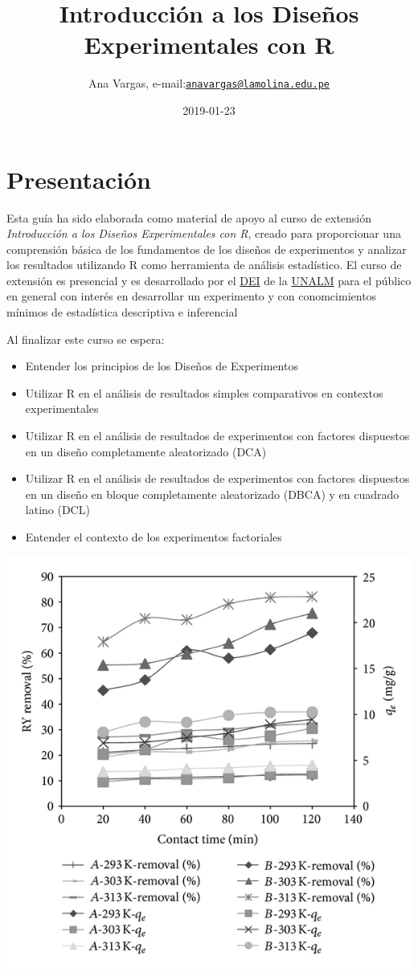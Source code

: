 \documentclass[]{book}
\title{Introducción a los Diseños Experimentales con R}
\author{Ana Vargas,
e-mail:\href{mailto:anavargas@lamolina.edu.pe}{\nolinkurl{anavargas@lamolina.edu.pe}}}
\date{2019-01-23}
\providecommand{\tightlist}{%
  \setlength{\itemsep}{0pt}\setlength{\parskip}{0pt}}
\begin{document}
\maketitle

{
\setcounter{tocdepth}{1}
\tableofcontents
}
\chapter*{Presentación}\label{presentacion}

Esta guía ha sido elaborada como material de apoyo al curso de extensión
\emph{Introducción a los Diseños Experimentales con R}, creado para
proporcionar una comprensión básica de los fundamentos de los diseños de
experimentos y analizar los resultados utilizando R como herramienta de
análisis estadístico. El curso de extensión es presencial y es
desarrollado por el
\href{http://www.lamolina.edu.pe/facultad/economia/index.php/depacaestinf/}{DEI}
de la \href{http://www.lamolina.edu.pe}{UNALM} para el público en
general con interés en desarrollar un experimento y con conomcimientos
mínimos de estadística descriptiva e inferencial

Al finalizar este curso se espera:

\begin{itemize}
\tightlist
\item
  Entender los principios de los Diseños de Experimentos
\item
  Utilizar R en el análisis de resultados simples comparativos en
  contextos experimentales
\item
  Utilizar R en el análisis de resultados de experimentos con factores
  dispuestos en un diseño completamente aleatorizado (DCA)
\item
  Utilizar R en el análisis de resultados de experimentos con factores
  dispuestos en un diseño en bloque completamente aleatorizado (DBCA) y
  en cuadrado latino (DCL)
\item
  Entender el contexto de los experimentos factoriales
\end{itemize}

\begin{center}\includegraphics[width=0.35\linewidth]{imagenes/cover} \end{center}
\end{document}
